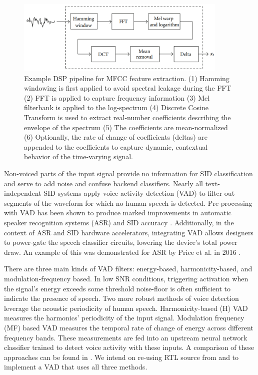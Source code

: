 \documentclass[journal,12pt,onecolumn,draftclsnofoot,]{sty/IEEEtran}
\begin{document}
\begin{figure}
\centering
\includegraphics[width=0.9\textwidth]{figs/mfcc.png}
\caption{Example DSP pipeline for MFCC feature extraction. (1) Hamming windowing is first applied to avoid spectral leakage during the FFT (2) FFT is applied to capture frequency information (3) Mel filterbank is applied to the log-spectrum (4) Discrete Cosine Transform is used to extract real-number coefficients describing the envelope of the spectrum (5) The coefficients are mean-normalized (6) Optionally, the rate of change of coefficients (deltas) are appended to the coefficients to capture dynamic, contextual behavior of the time-varying signal. \cite{fpga_gmm}}
\label{mfcc}
\end{figure}

Non-voiced parts of the input signal provide no information for SID classification and serve to add noise and confuse backend classifiers. Nearly all text-independent SID systems apply voice-activity detection (VAD) to filter out segments of the waveform for which no human speech is detected. Pre-processing with VAD has been shown to produce marked improvements in automatic speaker recognition systems (ASR) and SID accuracy \cite{vad_hmf}. Additionally, in the context of ASR and SID hardware accelerators, integrating VAD allows designers to power-gate the speech classifier circuits, lowering the device’s total power draw. An example of this was demonstrated for ASR by Price et al. in 2016 \cite{price_dnn}.

There are three main kinds of VAD filters: energy-based, harmonicity-based, and modulation-frequency based. In low SNR conditions, triggering activation when the signal’s energy exceeds some threshold noise-floor is often sufficient to indicate the presence of speech. Two more robust methods of voice detection leverage the acoustic periodicity of human speech. Harmonicity-based (H) VAD measures the harmonics’ periodicity of the input signal. Modulation frequency (MF) based VAD measures the temporal rate of change of energy across different frequency bands. These measurements are fed into an upstream neural network classifier trained to detect voice activity with these inputs. A comparison of these approaches can be found in \cite{price_dnn}. We intend on re-using RTL source from \cite{price_wfst} and \cite{price_dnn} to implement a VAD that uses all three methods.
\end{document}
